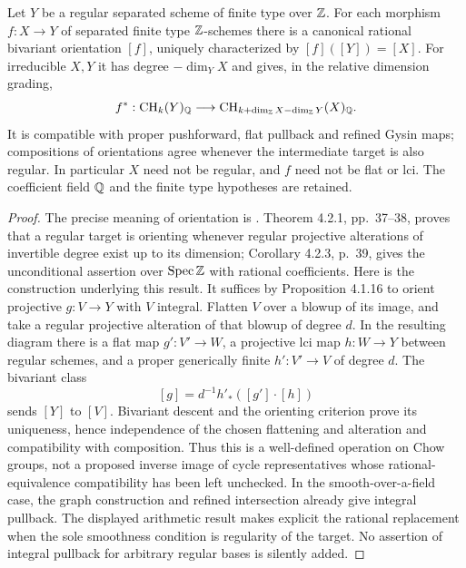 \begin{theorem}\label{thm:B3-chow-pullback}
Let $Y$ be a regular separated scheme of finite type over ${\mathbb{Z}}$.
For each morphism $f:X\to Y$ of separated finite type ${\mathbb{Z}}$-schemes
there is a canonical rational bivariant orientation $[f]$, uniquely
characterized by $[f]([Y])=[X]$. For irreducible $X,Y$ it has degree
$-\dim_YX$ and gives, in the relative dimension grading,
\[
 f^*:\mathrm{CH}_k(Y)_{\mathbb{Q}}\longrightarrow
       \mathrm{CH}_{k+\dim_{\mathbb{Z}} X-\dim_{\mathbb{Z}} Y}(X)_{\mathbb{Q}}.
\]
It is compatible with proper pushforward, flat pullback and refined
Gysin maps; compositions of orientations agree whenever the
intermediate target is also regular. In particular $X$ need not be
regular, and $f$ need not be flat or lci. The coefficient field
${\mathbb{Q}}$ and the finite type hypotheses are retained.
\end{theorem}
\begin{proof}
The precise meaning of orientation is
\cite[Definition 4.1.12 and Lemma 4.1.13, pp.~29--30]{BWeber2015}.
Theorem 4.2.1, pp.~37--38, proves that a regular target is orienting
whenever regular projective alterations of invertible degree exist
up to its dimension; Corollary 4.2.3, p.~39, gives the unconditional
assertion over $\operatorname{Spec}{\mathbb{Z}}$ with rational coefficients.
Here is the construction underlying this result. It suffices by
Proposition 4.1.16 to orient projective $g:V\to Y$ with $V$ integral.
Flatten $V$ over a blowup of its image, and take a regular projective
alteration of that blowup of degree $d$. In the resulting diagram
there is a flat map $g':V'\to W$, a projective lci map $h:W\to Y$
between regular schemes, and a proper generically finite
$h':V'\to V$ of degree $d$. The bivariant class
\[
             [g]=d^{-1}h'_*([g']\cdot[h])
\]
sends $[Y]$ to $[V]$. Bivariant descent and the orienting criterion
prove its uniqueness, hence independence of the chosen flattening
and alteration and compatibility with composition. Thus this is a
well-defined operation on Chow groups, not a proposed inverse image
of cycle representatives whose rational-equivalence compatibility
has been left unchecked. In the smooth-over-a-field case, the graph
construction and refined intersection already give integral
pullback. The displayed arithmetic result makes explicit the
rational replacement when the sole smoothness condition is
regularity of the target. No assertion of integral pullback for
arbitrary regular bases is silently added.
\end{proof}

